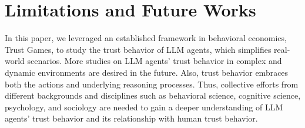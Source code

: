 \section{Limitations and Future Works}\label{limit}

In this paper, we leveraged an established framework in behavioral economics, Trust Games, to study the trust behavior of LLM agents, which simplifies real-world scenarios. More studies on LLM agents' trust behavior in complex and dynamic environments are desired in the future. Also, trust behavior embraces both the actions and underlying reasoning processes. Thus, collective efforts from different backgrounds and disciplines such as behavioral science, cognitive science, psychology, and sociology are needed to gain a deeper understanding of LLM agents' trust behavior and its relationship with human trust behavior.






